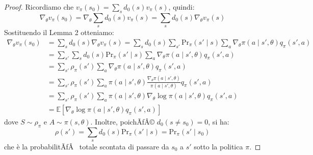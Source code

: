 ﻿\documentclass[11pt, a4paper]{report}
\begin{document}
\begin{proof}
Ricordiamo che $v_{\pi}(s_0) = \sum_s d_0(s) v_{\pi}(s)$, quindi:
\begin{equation}
\nabla_{\theta} v_{\pi}(s_0) = \nabla_{\theta} \sum_s d_0(s) v_{\pi}(s) = \sum_s d_0(s) \nabla_{\theta} v_{\pi}(s)
\end{equation}
Sostituendo il Lemma 2 otteniamo:
\begin{align*}
\nabla_{\theta} v_{\pi}(s_0) &= \sum_s d_0(s) \nabla_{\theta} v_{\pi}(s) = \sum_s d_0(s) \sum_{s'} \text{Pr}_{\pi}(s' \mid s) \sum_a \nabla_{\theta} \pi(a \mid s', \theta) q_{\pi}(s', a) \\
&= \sum_{s'} \sum_s d_0(s) \text{Pr}_{\pi}(s' \mid s) \sum_a \nabla_{\theta} \pi(a \mid s', \theta) q_{\pi}(s', a) \\
&= \sum_{s'} \rho_{\pi}(s') \sum_a \nabla_{\theta} \pi(a \mid s', \theta) q_{\pi}(s', a) \\
&= \sum_{s'} \rho_{\pi}(s') \sum_a \pi(a \mid s', \theta) \frac{\nabla_{\theta} \pi(a \mid s', \theta)}{\pi(a \mid s', \theta)} q_{\pi}(s', a) \\
&= \sum_{s'} \rho_{\pi}(s') \sum_a \pi(a \mid s', \theta) \nabla_{\theta} \log \pi(a \mid s', \theta) q_{\pi}(s', a) \\
&= \mathbb{E} [\nabla_{\theta} \log \pi(a \mid s', \theta) q_{\pi}(s', a)]
\end{align*}
dove $S \sim \rho_{\pi}$ e $A \sim \pi(s, \theta)$. Inoltre, poichÃƒÂ© $d_0(s \neq s_0) = 0$, si ha:
\begin{equation}
\rho(s') = \sum_s d_0(s) \text{Pr}_{\pi}(s' \mid s) = \text{Pr}_{\pi}(s' \mid s_0)
\end{equation}
che è la probabilitÃƒÂ  totale scontata di passare da $s_0$ a $s'$ sotto la politica $\pi$.
\end{proof}

\begin{center}
\end{center}
\end{document}
